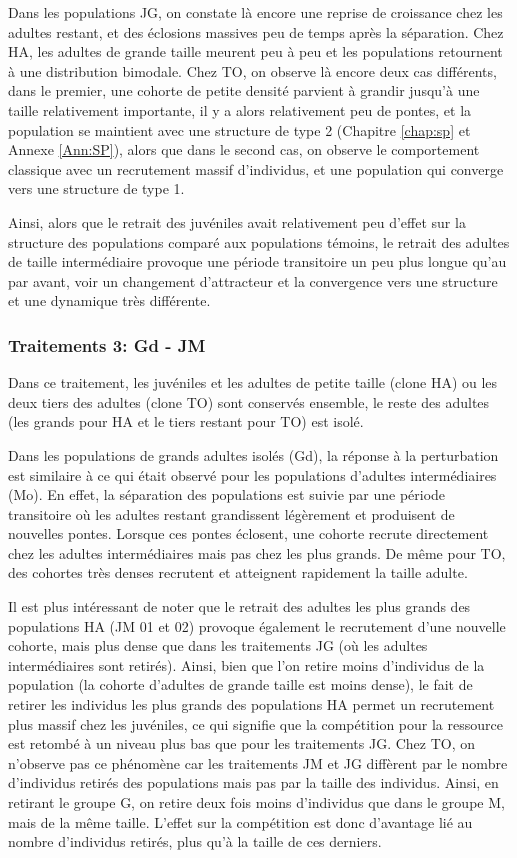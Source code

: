 Dans les populations JG, on constate là encore une reprise de croissance chez
les adultes restant, et des éclosions massives peu de temps après la séparation.
Chez HA, les adultes de grande taille meurent peu à peu et les populations
retournent à une distribution bimodale. Chez TO, on observe là encore deux cas
différents, dans le premier, une cohorte de petite densité parvient à grandir
jusqu'à une taille relativement importante, il y a alors relativement peu de
pontes, et la population se maintient avec une structure de type 2 (Chapitre
\ref{chap:sp} et Annexe \ref{Ann:SP}), alors que dans le second cas, on observe le
comportement classique avec un recrutement massif d'individus, et une population qui converge
vers une structure de type 1.

Ainsi, alors que le retrait des juvéniles avait relativement peu d'effet sur la
structure des populations comparé aux populations témoins, le retrait des
adultes de taille intermédiaire provoque une période transitoire un peu plus
longue qu'au par avant, voir un changement d'attracteur et la convergence vers
une structure et une dynamique très différente. 

\subsubsection{Traitements 3: Gd - JM}

Dans ce traitement, les juvéniles et les adultes de petite taille (clone HA) ou
les deux tiers des adultes (clone TO) sont conservés ensemble, le reste des
adultes (les grands pour HA et le tiers restant pour TO) est isolé. 

Dans les populations de grands adultes isolés (Gd), la réponse à la perturbation
est similaire à ce qui était observé pour les populations d'adultes
intermédiaires (Mo). En effet, la séparation des populations est suivie par une
période transitoire où les adultes restant grandissent légèrement et produisent
de nouvelles pontes. Lorsque ces pontes éclosent, une cohorte recrute
directement chez les adultes intermédiaires mais pas chez les plus grands. De
même pour TO, des cohortes très denses recrutent et atteignent rapidement la
taille adulte. 

Il est plus intéressant de noter que le retrait des adultes les plus grands des
populations HA  (JM 01 et 02) provoque également le recrutement d'une nouvelle
cohorte, mais plus dense que dans les traitements JG (où les adultes
intermédiaires sont retirés). Ainsi, bien que l'on retire moins d'individus
de la population (la cohorte d'adultes de grande taille est moins dense), le
fait de retirer les individus les plus grands des populations HA permet un
recrutement plus massif chez les juvéniles, ce qui signifie que la compétition
pour la ressource est retombé à un niveau plus bas que pour les traitements JG.
Chez TO, on n'observe pas ce phénomène car les traitements JM et JG diffèrent
par le nombre d'individus retirés des populations mais pas par la taille des
individus. Ainsi, en retirant le groupe G, on retire deux fois moins d'individus
que dans le groupe M, mais de la même taille. L'effet sur la compétition est
donc d'avantage lié au nombre d'individus retirés, plus qu'à la taille de ces
derniers. 

